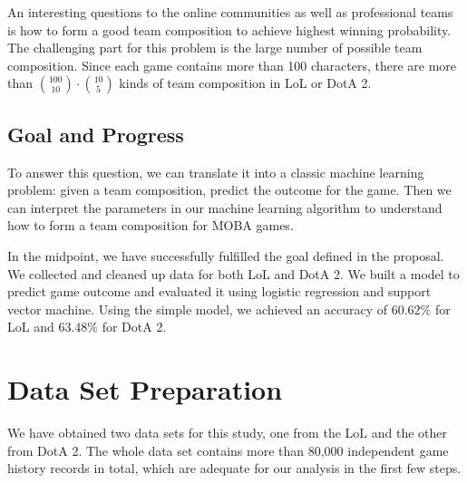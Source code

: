 \documentclass{article} %
\begin{document}
An interesting questions to the online communities as well as professional teams is how to form a good team composition to achieve highest winning probability. The challenging part for this problem is the large number of possible team composition. Since each game contains more than 100 characters, there are more than $\binom{100}{10}\cdot\binom{10}{5}$ kinds of team composition in LoL or DotA 2.

\subsection{Goal and Progress}

To answer this question, we can translate it into a classic machine learning problem: given a team composition, predict the outcome for the game. Then we can interpret the parameters in our machine learning algorithm to understand how to form a team composition for MOBA games.

In the midpoint, we have successfully fulfilled the goal defined in the proposal.
We collected and cleaned up data for both LoL and DotA 2.
We built a model to predict game outcome and evaluated it using logistic regression and support vector machine.
Using the simple model, we achieved an accuracy of $60.62\%$ for LoL and $63.48\%$ for DotA 2.



\section{Data Set Preparation}
We have obtained two data sets for this study, one from the LoL and the other from DotA 2. The whole data set contains more than 80,000 independent game history records in total, which are adequate for our analysis in the first few steps.
\end{document}
